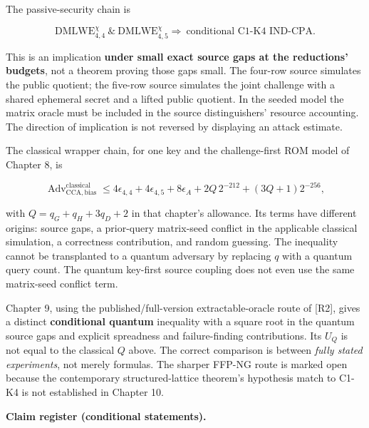 \documentclass[
  11pt,
  a4paper,
  oneside]{report}
\begin{document}
The passive-security chain is

\[
\mathrm{DMLWE}_{4,4}^{\chi}
\ \&\ \mathrm{DMLWE}_{4,5}^{\chi}
\Longrightarrow\ \text{conditional C1-K4 IND-CPA}.
\]

This is an implication \textbf{under small exact source gaps at the
reductions' budgets}, not a theorem proving those gaps small. The
four-row source simulates the public quotient; the five-row source
simulates the joint challenge with a shared ephemeral secret and a
lifted public quotient. In the seeded model the matrix oracle must be
included in the source distinguishers' resource accounting. The
direction of implication is not reversed by displaying an attack
estimate.

The classical wrapper chain, for one key and the challenge-first ROM
model of Chapter 8, is

\[
\operatorname{Adv}^{\mathrm{classical}}_{\mathrm{CCA,bias}}
\le4\epsilon_{4,4}+4\epsilon_{4,5}+8\epsilon_A
+2Q\,2^{-212}+(3Q+1)2^{-256},
\]

with \(Q=q_G+q_H+3q_D+2\) in that chapter's allowance. Its terms have
different origins: source gaps, a prior-query matrix-seed conflict in
the applicable classical simulation, a correctness contribution, and
random guessing. The inequality cannot be transplanted to a quantum
adversary by replacing \(q\) with a quantum query count. The quantum
key-first source coupling does not even use the same matrix-seed
conflict term.

Chapter 9, using the published/full-version extractable-oracle route of
{[}R2{]}, gives a distinct \textbf{conditional quantum} inequality with
a square root in the quantum source gaps and explicit spreadness and
failure-finding contributions. Its \(U_Q\) is not equal to the classical
\(Q\) above. The correct comparison is between \emph{fully stated
experiments}, not merely formulas. The sharper FFP-NG route is marked
open because the contemporary structured-lattice theorem's hypothesis
match to C1-K4 is not established in Chapter 10.

\textbf{Claim register (conditional statements).}
\end{document}
